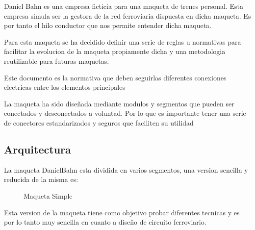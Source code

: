 Daniel Bahn es una empresa ficticia para una maqueta de trenes personal. Esta empresa simula ser la gestora de la red ferroviaria dispuesta en dicha maqueta.
Es por tanto el hilo conductor que nos permite entender dicha maqueta.

Para esta maqueta se ha decidido definir una serie de reglas u normativas para facilitar la evolucion de la maqueta propiamente dicha y una metodologia
reutilizable para futuras maquetas.

Este documento es la normativa que deben seguirlas diferentes conexiones electricas entre los elementos principales

La maqueta ha sido diseñada mediante modulos y segmentos que pueden ser conectados y desconectados a voluntad.
Por lo que es importante tener una serie de conectores estandarizados y seguros que faciliten su utilidad

\subsection{Arquitectura}
La maqueta DanielBahn esta dividida en varios segmentos, una version sencilla y reducida
 de la misma es:

\begin{figure}[H]
    \centering
    
    \caption{Maqueta Simple}
    \label{fig:MaquetaSimple}
\end{figure}

Esta version de la maqueta tiene como objetivo probar diferentes tecnicas
y es por lo tanto muy sencilla en cuanto a diseño de circuito ferroviario.

